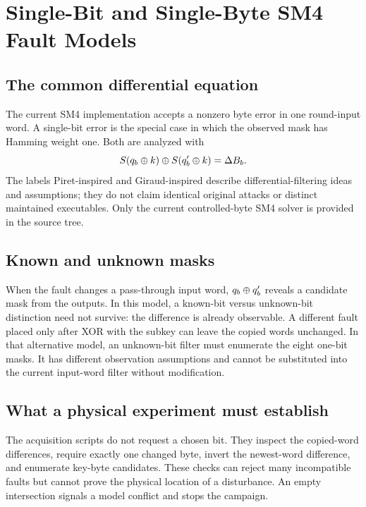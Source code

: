 \chapter{Single-Bit and Single-Byte SM4 Fault Models}
\label{chap:giraud}
\section{The common differential equation}
The current SM4 implementation accepts a nonzero byte error in one round-input word. A single-bit error is the special case in which the observed mask has Hamming weight one. Both are analyzed with
\[
S(q_b\mathbin{\oplus} k)\mathbin{\oplus} S(q'_b\mathbin{\oplus} k)=\Delta B_b.
\]
The labels Piret-inspired and Giraud-inspired describe differential-filtering ideas and assumptions; they do not claim identical original attacks or distinct maintained executables. Only the current controlled-byte SM4 solver is provided in the source tree.
\section{Known and unknown masks}
When the fault changes a pass-through input word, $q_b\mathbin{\oplus} q'_b$ reveals a candidate mask from the outputs. In this model, a known-bit versus unknown-bit distinction need not survive: the difference is already observable.
A different fault placed only after XOR with the subkey can leave the copied words unchanged. In that alternative model, an unknown-bit filter must enumerate the eight one-bit masks. It has different observation assumptions and cannot be substituted into the current input-word filter without modification.
\section{What a physical experiment must establish}
The acquisition scripts do not request a chosen bit. They inspect the copied-word differences, require exactly one changed byte, invert the newest-word difference, and enumerate key-byte candidates. These checks can reject many incompatible faults but cannot prove the physical location of a disturbance. An empty intersection signals a model conflict and stops the campaign.

